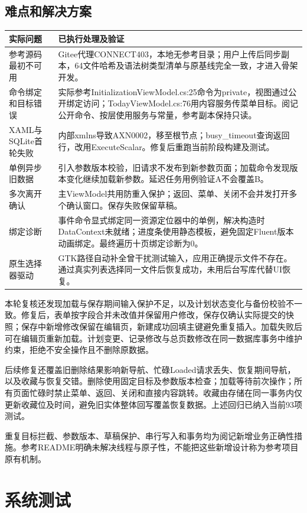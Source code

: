 \documentclass[UTF8,a4paper,11pt,fontset=none]{ctexart}
\begin{document}
\subsection{难点和解决方案}
\begin{longtable}{p{34mm}p{105mm}}\toprule 实际问题 & 已执行处理及验证\\\midrule
参考源码最初不可用 & Gitee代理CONNECT403，本地无参考目录；用户上传后同步副本，64文件哈希及语法树类型清单与原基线完全一致，才进入骨架开发。\\
命令绑定和目标错误 & 实际参考InitializationViewModel.cs:25命令为private，视图通过公开绑定访问；TodayViewModel.cs:76用内容服务传菜单目标。阅记公开命令、按层使用服务与常量，参考副本保持只读。\\
XAML与SQLite首轮失败 & 内部xmlns导致AXN0002，移至根节点；busy\_timeout查询返回行，改用ExecuteScalar。修复后重跑当前阶段构建及测试。\\
单例异步旧数据 & 引入参数版本校验，旧请求不发布到新参数页面；加载命令发现版本变化继续加载新参数。延迟任务用例验证A不会覆盖B。\\
多次离开确认 & 主ViewModel共用防重入保护；返回、菜单、关闭不会并发打开多个确认窗口。保存失败保留草稿。\\
绑定诊断 & 事件命令显式绑定同一资源定位器中的单例，解决构造时DataContext未就绪；进度条使用静态模板，避免固定Fluent版本动画绑定。最终遍历十页绑定诊断为0。\\
原生选择器驱动 & GTK路径自动补全曾干扰测试输入，应用正确提示文件不存在。通过真实列表选择同一文件后恢复成功，未用后台写库代替UI恢复。\\\bottomrule
\end{longtable}

本轮复核还发现加载与保存期间输入保护不足，以及计划状态变化与备份校验不一致。修复后，表单按字段合并未改值并保留用户修改，保存仅确认实际提交的快照；保存中新增修改保留在编辑页，新建成功回填主键避免重复插入。加载失败后可在编辑页重新加载。计划变更、记录修改与总页数修改在同一数据库事务中维护约束，拒绝不安全操作且不删除原数据。

后续修复还覆盖旧删除结果影响新导航、忙碌Loaded请求丢失、恢复期间导航，以及收藏与恢复交错。删除使用固定目标及参数版本检查；加载等待前次操作；所有页面忙碌时禁止菜单、返回、关闭和直接内容跳转。收藏由存储在同一事务内仅更新收藏位及时间，避免旧实体整体回写覆盖恢复数据。上述回归已纳入当前93项测试。

重复目标拦截、参数版本、草稿保护、串行写入和事务均为阅记新增业务正确性措施。参考README明确未解决线程与原子性，不能把这些新增设计称为参考项目原有机制。
\section{系统测试}
\end{document}
